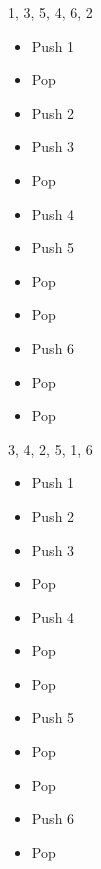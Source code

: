 \documentclass[11pt,a4paper]{article}
\begin{document}


\begin{center}
\begin{table}[ht!]
  \centering
  \begin{minipage}{0.33\textwidth}

\begin{center}
\begin{large}
1, 3, 5, 4, 6, 2
\end{large}

\medskip

\begin{itemize}
\item Push 1
\item Pop
\item Push 2
\item Push 3
\item Pop
\item Push 4
\item Push 5
\item Pop
\item Pop
\item Push 6
\item Pop
\item Pop
\end{itemize}

\end{center}

  \end{minipage}
  \hfillx
  \begin{minipage}{0.33\textwidth}

\begin{center}
\begin{large}
3, 4, 2, 5, 1, 6
\end{large}

\medskip

\begin{itemize}
\item Push 1
\item Push 2
\item Push 3
\item Pop
\item Push 4
\item Pop
\item Pop
\item Push 5
\item Pop
\item Pop
\item Push 6
\item Pop
\end{itemize}


\end{center}
\end{minipage}
\end{table}
\end{center}
\end{document}
